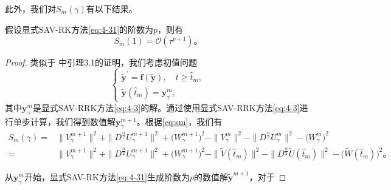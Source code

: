 此外，我们对$S_m(\gamma)$有以下结果。
\begin{lemma}\label{lem:5_1}
假设显式SAV-RK方法\eqref{eq:4-31}的阶数为$p$，则有
\begin{equation}
S_m(1)=\mathcal{O}(\tau^{p+1})。
\end{equation}
\end{lemma}

\begin{proof}
类似于%
中引理3.1的证明，我们考虑初值问题
\begin{equation}
\left\{\begin{array}{l}
\tilde{\bm{y}}^{\prime}=\bm{f}(\tilde{\bm{y}}), \quad t \geq \hat{t}_m, \\
\tilde{\bm{y}}\left(\hat{t}_m\right)=\bm{y}_\gamma^m,
\end{array}\right.
\end{equation}
其中$\bm{y}_\gamma^m$是显式SAV-RRK方法\eqref{eq:4-3}的解。通过使用显式SAV-RRK方法\eqref{eq:4-3}进行单步计算，我们得到数值解$\bm{y}_\gamma^{m+1}$。根据\eqref{eq:sm}，我们有
\begin{equation}
\begin{aligned}
S_m(\gamma) =& \|V_\gamma^{m+1}\|^2 + \|D^\frac{\alpha}{2} U_\gamma^{m+1}\|^2+\big(W_\gamma^{m+1}\big)^2-\|V_\gamma^{m}\|^2 - \|D^\frac{\alpha}{2} U_\gamma^{m}\|^2-\big(W_\gamma^{m}\big)^2\\
=& \|V_\gamma^{m+1}\|^2 + \|D^\frac{\alpha}{2} U_\gamma^{m+1}\|^2+\big(W_\gamma^{m+1}\big)^2-\|\tilde{V}(\hat{t}_{m})\|^2 - \|D^\frac{\alpha}{2} \tilde{U}(\hat{t}_{m})\|^2-\big(\tilde{W}(\hat{t}_{m})\big)^2。
\end{aligned}
\end{equation}

从$\bm{y}_\gamma^m$开始，显式SAV-RK方法\eqref{eq:4-31}生成阶数为$p$的数值解$\tilde{\bm{y}}^{m+1}$，对于


\end{proof}
